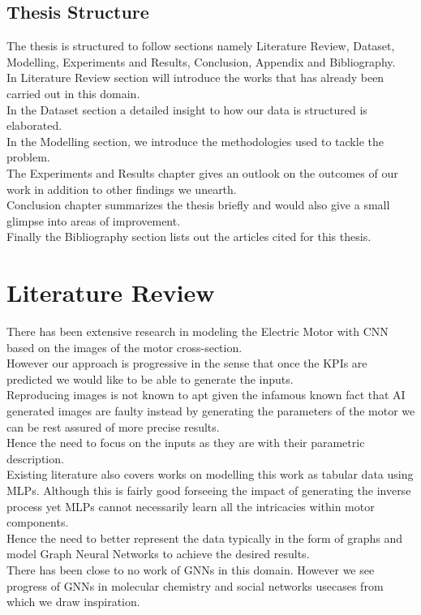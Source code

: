 \documentclass{report} %
\begin{document}
\section{Thesis Structure}\label{sec:Thesis Structure}

The thesis is structured to follow sections namely Literature Review, Dataset, Modelling, Experiments and Results, Conclusion, Appendix and Bibliography.\\
In Literature Review section will introduce the works that has already been carried out in this domain. \\
In the Dataset section a detailed insight to how our data is structured is elaborated.\\
In the Modelling section, we introduce the methodologies used to tackle the problem. \\
The Experiments and Results chapter gives an outlook on the outcomes of our work in addition to other findings we unearth.\\ 
Conclusion chapter summarizes the thesis briefly and would also give a small glimpse into areas of improvement. \\
Finally the Bibliography section lists out the articles cited for this thesis.\\
\newpage 

\chapter{Literature Review} 
There has been extensive research in modeling the Electric Motor with \ac{CNN} based on the images of the motor cross-section. \\
However our approach is progressive in the sense that once the \ac{KPI}s are predicted we would like to be able to generate the inputs.\\
Reproducing images is not known to apt given the infamous known fact that AI generated images are faulty instead by generating the parameters of the motor we can be rest assured of more precise results. \\
Hence the need to focus on the inputs as they are with their parametric description.\\
Existing literature also covers works on modelling this work as tabular data using \ac{MLP}s. 
Although this is fairly good forseeing the impact of generating the inverse process yet \ac{MLP}s cannot necessarily learn all the intricacies within motor components. \\
Hence the need to better represent the data typically in the form of graphs and model Graph Neural Networks to achieve the desired results. \\
There has been close to no work of \ac{GNN}s in this domain. However we see progress of \ac{GNN}s in molecular chemistry and social networks usecases from which we draw inspiration.\\
\end{document}
